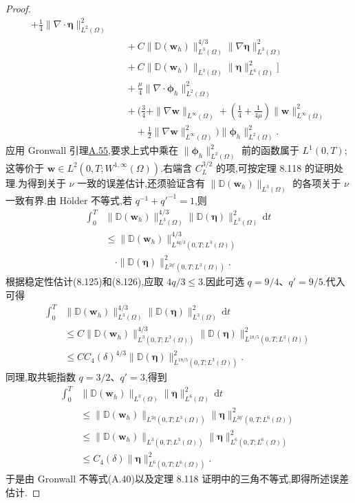 \begin{theorem}
\begin{proof}
\[\begin{aligned}
 +\frac14\|\nabla\cdot\symbf{\eta}\|_{L^2(\Omega)}^2\\
&\quad+C\|\mathbb{D}(\bm{w}_h)\|_{L^3(\Omega)}^{4/3}
   \|\nabla\symbf{\eta}\|_{L^3(\Omega)}^2\\
&\quad+C\|\mathbb{D}(\bm{w}_h)\|_{L^3(\Omega)}
   \|\symbf{\eta}\|_{L^6(\Omega)}^2\Biggr]\\
&\quad+\frac\mu4\|\nabla\cdot\symbf{\phi}_h\|_{L^2(\Omega)}^2\\
&\quad+\Biggl(
 \frac34+\|\nabla\bm{w}\|_{L^\infty(\Omega)}
 +\left(\frac14+\frac1{4\mu}\right)
     \|\bm{w}\|_{L^\infty(\Omega)}^2\\
&\qquad+\frac12\|\nabla\bm{w}\|_{L^\infty(\Omega)}^2
 \Biggr)\|\symbf{\phi}_h\|_{L^2(\Omega)}^2.
\end{aligned}
\]
应用 Gronwall 引理\hyperref[lem:appendix-a-55]{A.55},要求上式中乘在
$\|\symbf{\phi}_h\|_{L^2(\Omega)}^2$ 前的函数属于 $L^1(0,T)$;这等价于
$\bm{w}\in L^2(0,T;W^{1,\infty}(\Omega))$.右端含 $C_L^{3/2}$ 的项,可按定理
8.118 的证明处理.为得到关于 $\nu$ 一致的误差估计,还须验证含有
$\|\mathbb{D}(\bm{w}_h)\|_{L^3(\Omega)}$ 的各项关于 $\nu$ 一致有界.由 Hölder 不等式,若
$q^{-1}+{q'}^{-1}=1$,则
\[
\begin{aligned}
\int_0^T&\|\mathbb{D}(\bm{w}_h)\|_{L^3(\Omega)}^{4/3}
       \|\mathbb{D}(\symbf{\eta})\|_{L^3(\Omega)}^2\,\mathrm{d}t\\
&\le\|\mathbb{D}(\bm{w}_h)\|_{L^{4q/3}(0,T;L^3(\Omega))}^{4/3}\\
&\quad\cdot\|\mathbb{D}(\symbf{\eta})\|_{L^{2q'}(0,T;L^3(\Omega))}^2.
\end{aligned}
\]
根据稳定性估计(8.125)和(8.126),应取 $4q/3\le3$.因此可选
$q=9/4$、$q'=9/5$.代入可得
\[
\begin{aligned}
\int_0^T&\|\mathbb{D}(\bm{w}_h)\|_{L^3(\Omega)}^{4/3}
       \|\mathbb{D}(\symbf{\eta})\|_{L^3(\Omega)}^2\,\mathrm{d}t\\
&\le C\|\mathbb{D}(\bm{w}_h)\|_{L^3(0,T;L^3(\Omega))}^{4/3}
   \|\mathbb{D}(\symbf{\eta})\|_{L^{18/5}(0,T;L^3(\Omega))}^2\\
&\le CC_4(\delta)^{4/3}
   \|\mathbb{D}(\symbf{\eta})\|_{L^{18/5}(0,T;L^3(\Omega))}^2.
\end{aligned}
\]
同理,取共轭指数 $q=3/2$、$q'=3$,得到
\[
\begin{aligned}
\int_0^T&\|\mathbb{D}(\bm{w}_h)\|_{L^3(\Omega)}
       \|\symbf{\eta}\|_{L^6(\Omega)}^2\,\mathrm{d}t\\
&\le\|\mathbb{D}(\bm{w}_h)\|_{L^{2q}(0,T;L^3(\Omega))}
   \|\symbf{\eta}\|_{L^{2q'}(0,T;L^6(\Omega))}^2\\
&\le\|\mathbb{D}(\bm{w}_h)\|_{L^3(0,T;L^3(\Omega))}
   \|\symbf{\eta}\|_{L^6(0,T;L^6(\Omega))}^2\\
&\le C_4(\delta)
   \|\symbf{\eta}\|_{L^6(0,T;L^6(\Omega))}^2.
\end{aligned}
\]
于是由 Gronwall 不等式(A.40)以及定理 8.118 证明中的三角不等式,即得所述误差估计.
\end{proof}
\end{theorem}

